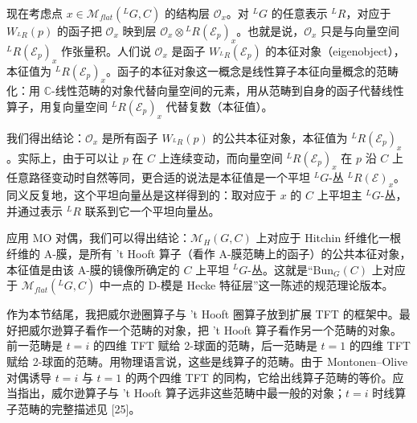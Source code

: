 \documentclass[11pt,a4paper,UTF8]{ctexart}
\begin{document}
现在考虑点 $x\in\mathcal{M}_{flat}({}^{L}G,C)$ 的结构层 $\mathcal{O}_{x}$。对 ${}^{L}G$ 的任意表示 ${}^{L}R$，对应于 $W_{{}^{L}R}(p)$ 的函子把 $\mathcal{O}_{x}$ 映到层 $\mathcal{O}_{x}\otimes{}^{L}R(\mathcal{E}_{p})_{x}$。也就是说，$\mathcal{O}_{x}$ 只是与向量空间 ${}^{L}R(\mathcal{E}_{p})_{x}$ 作张量积。人们说 $\mathcal{O}_{x}$ 是函子 $W_{{}^{L}R}(\mathcal{E}_{p})$ 的本征对象（eigenobject），本征值为 ${}^{L}R(\mathcal{E}_{p})_{x}$。函子的本征对象这一概念是线性算子本征向量概念的范畴化：用 $\mathbb{C}$-线性范畴的对象代替向量空间的元素，用从范畴到自身的函子代替线性算子，用复向量空间 ${}^{L}R(\mathcal{E}_{p})_{x}$ 代替复数（本征值）。


我们得出结论：$\mathcal{O}_{x}$ 是所有函子 $W_{{}^{L}R}(p)$ 的公共本征对象，本征值为 ${}^{L}R(\mathcal{E}_{p})_{x}$。实际上，由于可以让 $p$ 在 $C$ 上连续变动，而向量空间 ${}^{L}R(\mathcal{E}_{p})_{x}$ 在 $p$ 沿 $C$ 上任意路径变动时自然等同，更合适的说法是本征值是一个平坦 ${}^{L}G$-丛 ${}^{L}R(\mathcal{E})_{x}$。同义反复地，这个平坦向量丛是这样得到的：取对应于 $x$ 的 $C$ 上平坦主 ${}^{L}G$-丛，并通过表示 ${}^{L}R$ 联系到它一个平坦向量丛。

应用 MO 对偶，我们可以得出结论：$\mathcal{M}_{H}(G,C)$ 上对应于 Hitchin 纤维化一根纤维的 A-膜，是所有 't Hooft 算子（看作 A-膜范畴上的函子）的公共本征对象，本征值是由该 A-膜的镜像所确定的 $C$ 上平坦 ${}^{L}G$-丛。这就是“$\mathrm{Bun}_{G}(C)$ 上对应于 $\mathcal{M}_{flat}({}^{L}G,C)$ 中一点的 D-模是 Hecke 特征层”这一陈述的规范理论版本。

作为本节结尾，我把威尔逊圈算子与 't Hooft 圈算子放到扩展 TFT 的框架中。最好把威尔逊算子看作一个范畴的对象，把 't Hooft 算子看作另一个范畴的对象。前一范畴是 $t=i$ 的四维 TFT 赋给 2-球面的范畴，后一范畴是 $t=1$ 的四维 TFT 赋给 2-球面的范畴。用物理语言说，这些是线算子的范畴。由于 Montonen–Olive 对偶诱导 $t=i$ 与 $t=1$ 的两个四维 TFT 的同构，它给出线算子范畴的等价。应当指出，威尔逊算子与 't Hooft 算子远非这些范畴中最一般的对象；$t=i$ 时线算子范畴的完整描述见 [25]。

\end{document}

